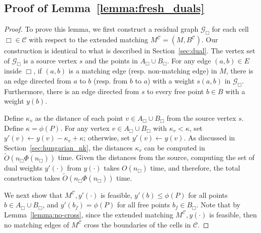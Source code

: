 \documentclass[11pt,onecolumn]{article}
\def\mcC{{\mathcal{C}}}
\def\mcG{{\mathcal{G}}}
\newcommand{\cell}{\Box}
\begin{document}
\subsection{Proof of Lemma~\ref{lemma:fresh_duals}}
%
\updateDuals*
\begin{proof}
    To prove this lemma, we first construct a residual graph $\mcG_\cell$ for each cell $\cell\in\mcC$ with respect to the extended matching $M^\mcC=(M, B^{\mcC})$. Our construction is identical to what is described in Section~\ref{sec:dual}. The vertex set of $\mcG_\cell$ is a source vertex $s$ and the points in $A_\cell\cup B_\cell$. For any edge $(a,b)\in E$ inside $\cell$, if $(a,b)$ is a matching edge (resp. non-matching edge) in $M$, there is an edge directed from $a$ to $b$ (resp. from $b$ to $a$) with a weight $s(a,b)$ in $\mcG_\cell$. Furthermore, there is an edge directed from $s$ to every free point $b\in B$ with a weight $y(b)$. 

    Define $\kappa_v$ as the distance of each point $v\in A_\cell\cup B_\cell$ from the source vertex $s$. Define $\kappa=\phi(P)$. For any vertex $v\in A_\cell\cup B_\cell$ with $\kappa_v<\kappa$, set $y'(v)\leftarrow y(v)-\kappa_v+\kappa$; otherwise, set $y'(v)\leftarrow y(v)$. As discussed in Section~\ref{sec:hungarian_nk}, the distances $\kappa_v$ can be computed in $\tilde{O}(n_\cell\Phi(n_\cell))$ time. Given the distances from the source, computing the set of dual weights $y'(\cdot)$ from $y(\cdot)$ takes $O(n_\cell)$ time, and therefore, the total construction takes $\tilde{O}(n_\cell\Phi(n_\cell))$ time. 
    
    We next show that $M^\mcC, y'(\cdot)$ is feasible, $y'(b)\le \phi(P)$ for all points $b\in A_\cell\cup B_\cell$, and $y'(b_f)=\phi(P)$ for all free points $b_f\in B_\cell$. Note that by Lemma~\ref{lemma:no-cross}, since the extended matching $M^\mcC, y(\cdot)$ is feasible, then no matching edges of $M^\mcC$ cross the boundaries of the cells in $\mcC$.


\end{proof}
\end{document}
